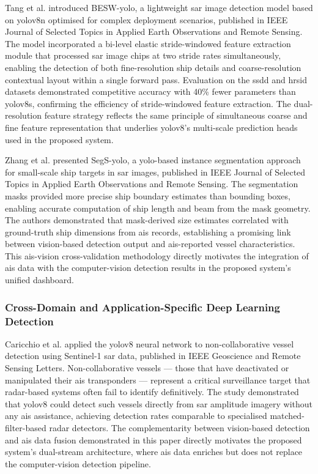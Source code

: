 Tang et al. \cite{Tang2025} introduced BESW-\gls{yolo}, a lightweight \gls{sar} image
detection model based on \gls{yolov8}n optimised for complex deployment scenarios,
published in IEEE Journal of Selected Topics in Applied Earth Observations and
Remote Sensing. The model incorporated a bi-level elastic stride-windowed feature
extraction module that processed \gls{sar} image chips at two stride rates simultaneously,
enabling the detection of both fine-resolution ship details and coarse-resolution
contextual layout within a single forward pass. Evaluation on the \gls{ssdd} and \gls{hrsid}
datasets demonstrated competitive accuracy with 40\% fewer parameters than
\gls{yolov8}s, confirming the efficiency of stride-windowed feature extraction. The
dual-resolution feature strategy reflects the same principle of simultaneous
coarse and fine feature representation that underlies \gls{yolov8}'s multi-scale
prediction heads used in the proposed system.
 
Zhang et al. \cite{Zhang2026} presented SegS-\gls{yolo}, a \gls{yolo}-based instance
segmentation approach for small-scale ship targets in \gls{sar} images, published
in IEEE Journal of Selected Topics in Applied Earth Observations and Remote
Sensing. The segmentation masks provided more precise ship boundary estimates
than bounding boxes, enabling accurate computation of ship length and beam from
the mask geometry. The authors demonstrated that mask-derived size estimates
correlated with ground-truth ship dimensions from \gls{ais} records, establishing
a promising link between vision-based detection output and \gls{ais}-reported vessel
characteristics. This \gls{ais}-vision cross-validation methodology directly motivates
the integration of \gls{ais} data with the computer-vision detection results in the
proposed system's unified dashboard.
 
\subsubsection{\textbf{Cross-Domain and Application-Specific Deep Learning Detection}}
Caricchio et al. \cite{Caricchio2025} applied the \gls{yolov8} neural network to
non-collaborative vessel detection using Sentinel-1 \gls{sar} data, published in IEEE
Geoscience and Remote Sensing Letters. Non-collaborative vessels --- those that
have deactivated or manipulated their \gls{ais} transponders --- represent a critical
surveillance target that radar-based systems often fail to identify definitively.
The study demonstrated that \gls{yolov8} could detect such vessels directly from \gls{sar}
amplitude imagery without any \gls{ais} assistance, achieving detection rates comparable
to specialised matched-filter-based radar detectors. The complementarity between
vision-based detection and \gls{ais} data fusion demonstrated in this paper directly
motivates the proposed system's dual-stream architecture, where \gls{ais} data enriches
but does not replace the computer-vision detection pipeline.
 
